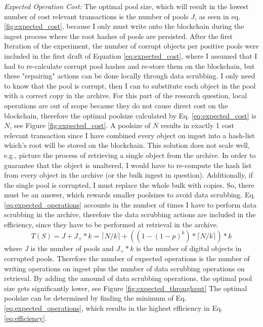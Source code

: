 \textit{Expected Operation Cost:} The optimal pool size, which will result in the lowest number of cost relevant transactions is the number of pools $J$, as seen in eq. \ref{fig:expected_cost}, because I only must write onto the blockchain during the ingest process where the root hashes of pools are persisted.
After the first Iteration of the experiment, the number of corrupt objects per positive pools were included in the first draft of Equation \ref{eq:expected_cost}, where I assumed that I had to re-calculate corrupt pool hashes and re-store them on the blockchain, but these "repairing" actions can be done locally through data scrubbing. I only need to know that the pool is corrupt, then I can to substitute each object in the pool with a correct copy in the archive. For this part of the research question, local operations are out of scope because they do not cause direct cost on the blockchain, therefore the optimal poolsize calculated by Eq. \ref{eq:expected_cost} is $N$, see Figure \ref{fig:expected_cost}. A poolsize of $N$ results in exactly 1 cost relevant transaction since I have combined every object on ingest into a hash-list which's root will be stored on the blockchain. This solution does not scale well, e.g., picture the process of retrieving a single object from the archive. In order to guarantee that the object is unaltered, I would have to re-compute the hash list from every object in the archive (or the bulk ingest in question). Additionally, if the single pool is corrupted, I must replace the whole bulk with copies. 
So, there must be an answer, which rewards smaller poolsizes to avoid data scrubbing. Eq. \ref{eq:expected_operations} accounts in the number of times I have to perform data scrubbing in the archive, therefore the data scrubbing actions are included in the efficiency, since they have to be performed at retrieval in the archive.
\begin{equation}\label{eq:expected_operations}
    T(S) = J + J_+ * k = \lceil N/k \rceil + ((1-(1-p)^k)* \lceil N/k \rceil) * k
\end{equation}
where \textit{J} is the number of pools and \textit{$J_+ * k$} is the number of digital objects in corrupted pools. Therefore the number of expected operations is the number of writing operations on ingest plus the number of data scrubbing operations on retrieval. By adding the amound of data scrubbing operations, the optimal pool size gets significantly lower, see Figure \ref{fig:expected_throughput} The optimal poolsize  can be determined by finding the minimum of Eq. \ref{eq:expected_operations}, which results in the highest efficiency in Eq. \ref{eq:efficiency}.
